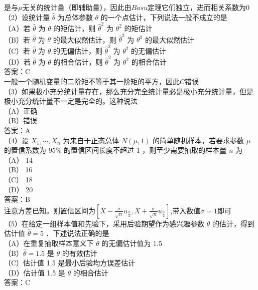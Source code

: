 \documentclass[12pt]{article}
\begin{document}
是与$\mu$无关的统计量（即辅助量），因此由$Basu$定理它们独立，进而相关系数为$0$\\
（2）设统计量 $\hat{\theta}$ 为总体参数 $\theta$ 的一个点估计，下列说法一般不成立的是\underline{\hspace{1cm}}\\
（A）若 $\hat{\theta}$ 为 $\theta$ 的矩估计，则 $\hat{\theta}^{2}$ 为 $\theta^{2}$ 的矩估计\\
（B）若 $\hat{\theta}$ 为 $\theta$ 的最大似然估计，则 $\hat{\theta}^{2}$ 为 $\theta^{2}$ 的最大似然估计\\
（C）若 $\hat{\theta}$ 为 $\theta$ 的无偏估计，则 $\hat{\theta}^{2}$ 为 $\theta^{2}$ 的无偏估计\\
（D）若 $\hat{\theta}$ 为 $\theta$ 的相合估计，则 $\hat{\theta}^{2}$ 为 $\theta^{2}$ 的相合估计\\
答案：C\\
一般一个随机变量的二阶矩不等于其一阶矩的平方，因此$C$错误\\
（3）如果极小充分统计量存在，那么充分完全统计量必是极小充分统计量，但是极小充分统计量不一定是完全的。这种说法\underline{\hspace{1cm}}\\
（A）正确\\
（B）错误\\
答案：A\\
（4）设 $X_{1}, \cdots, X_{n}$ 为来自于正态总体 $N(\mu, 1)$ 的简单随机样本，若要求参数 $\mu$ 的置信系数为 $95 \%$ 的置信区间长度不超过 1 ，则至少需要抽取的样本量 $n$ 为 \underline{\hspace{1cm}}\\
（A） 14\\
（B） 16\\
（C） 18\\
（D） 20\\
答案：B\\
注意方差已知。则置信区间为$\left[\overline{X}-\frac{\sigma}{\sqrt{n}} u_{\frac{\alpha}{2}}, \overline{X}+\frac{\sigma}{\sqrt{n}} u_{\frac{\alpha}{2}}\right]$,带入数值$\sigma=1$即可\\
（5）在给定一组样本值和先验下，采用后验期望作为感兴趣参数 $\theta$ 的估计，得到估计值 $\hat{\theta}=5$ ．下述说法正确的是\underline{\hspace{1cm}}\\
（A）在重复抽取样本意义下 $\theta$ 的无偏估计值为 1.5\\
（B）$\hat{\theta}=1.5$ 是 $\theta$ 的有效估计\\
（C）估计值 1.5 是最小后验均方误差估计\\
（D）估计值 1.5 是 $\theta$ 的相合估计\\
答案：C\\
\end{document}
